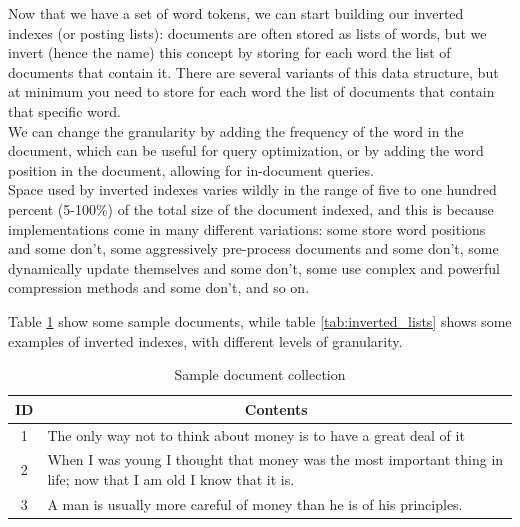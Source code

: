 Now that we have a set of word tokens, we can start building our inverted indexes (or posting lists): documents are often stored as lists of words, but we invert (hence the name) this concept by storing for each word the list of documents that contain it. There are several variants of this data structure, but at minimum you need to store for each word the list of documents that contain that specific word. \\
We can change the granularity by adding the frequency of the word in the document, which can be useful for query optimization, or by adding the word position in the document, allowing for in-document queries.\\
Space used by inverted indexes varies wildly in the range of five to one hundred percent (5-100\%) of the total size of the document indexed, and this is because implementations come in many different variations: some store word positions and some don't, some aggressively pre-process documents and some don't, some dynamically update themselves and some don't, some use complex and powerful compression methods and some don't, and so on. 

Table \ref{tab:sample_docs} show some sample documents, while table \ref{tab:inverted_lists} shows some examples of inverted indexes, with different levels of granularity.

\begin{table}[ht]
    \begin{center}
        \begin{tabularx}{\textwidth}{|c|X|}
            \hline
            \textbf{ID} & \multicolumn{1}{c|}{\textbf{Contents}}  \\ \hline
            1 & The only way not to think about money is to have a great deal of it \\ \hline
            2 & When I was young I thought that money was the most important thing in life; now that I am old I know that it is. \\ \hline
            3 & A man is usually more careful of money than he is of his principles.\\ \hline
        \end{tabularx}
        \caption{Sample document collection\label{tab:sample_docs}}
    \end{center}
\end{table}


